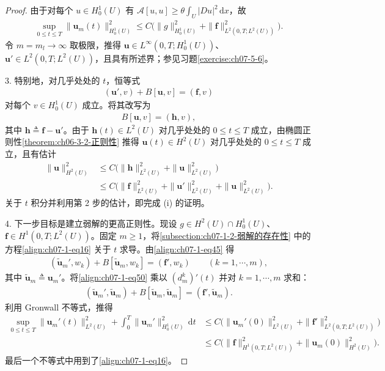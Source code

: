 \documentclass[../../main.tex]{subfiles}
\begin{document}
\begin{proof}
由于对每个 $u\in H^1_0(U)$ 有 $\mathcal{A}[u,u]\geqslant\theta\int_U|Du|^2\,\mathrm{d}x$，故
\begin{align}
\sup_{0\leqslant t\leqslant T}\|\mathbf{u}_m(t)\|_{H^1_0(U)}^2 \leqslant C\bigl(\|g\|_{H^1_0(U)}^2+\|\mathbf{f}\|_{L^2(0,T;L^2(U))}^2\bigr).\label{align:ch07-1-eq48}
\end{align}
令 $m=m_l\to\infty$ 取极限，推得 $\mathbf{u}\in L^\infty(0,T;H^1_0(U))$、$\mathbf{u}'\in L^2(0,T;L^2(U))$，且具有所述界；参见习题\cref{exercise:ch07-5-6}。

3. 特别地，对几乎处处的 $t$，恒等式
\begin{align*}
(\mathbf{u}',v)+B[\mathbf{u},v]=(\mathbf{f},v)
\end{align*}
对每个 $v\in H^1_0(U)$ 成立。将其改写为
\begin{align*}
B[\mathbf{u},v]=(\mathbf{h},v),
\end{align*}
其中 $\mathbf{h}\triangleq\mathbf{f}-\mathbf{u}'$。由于 $\mathbf{h}(t)\in L^2(U)$ 对几乎处处的 $0\leqslant t\leqslant T$ 成立，由椭圆正则性\cref{theorem:ch06-3-2-正则性} 推得 $\mathbf{u}(t)\in H^2(U)$ 对几乎处处的 $0\leqslant t\leqslant T$ 成立，且有估计
\begin{align}
\|\mathbf{u}\|_{H^2(U)}^2 &\leqslant C\bigl(\|\mathbf{h}\|_{L^2(U)}^2+\|\mathbf{u}\|_{L^2(U)}^2\bigr)\nonumber\\
&\leqslant C\bigl(\|\mathbf{f}\|_{L^2(U)}^2+\|\mathbf{u}'\|_{L^2(U)}^2+\|\mathbf{u}\|_{L^2(U)}^2\bigr).\label{align:ch07-1-eq49}
\end{align}
关于 $t$ 积分并利用第 2 步的估计，即完成 (i) 的证明。

4. 下一步目标是建立弱解的更高正则性。现设 $g\in H^2(U)\cap H^1_0(U)$、$\mathbf{f}\in H^1(0,T;L^2(U))$。固定 $m\geqslant 1$，将\cref{subsection:ch07-1-2-弱解的存在性} 中的方程\eqref{align:ch07-1-eq16} 关于 $t$ 求导。由\eqref{align:ch07-1-eq45} 得
\begin{align}
(\widetilde{\mathbf{u}}_m',w_k)+B[\widetilde{\mathbf{u}}_m,w_k]=(\mathbf{f}',w_k)\qquad (k=1,\cdots,m),\label{align:ch07-1-eq50}
\end{align}
其中 $\widetilde{\mathbf{u}}_m\triangleq\mathbf{u}_m'$。将\eqref{align:ch07-1-eq50} 乘以 $(d_m^k)'(t)$ 并对 $k=1,\cdots,m$ 求和：
\begin{align*}
(\widetilde{\mathbf{u}}_m',\widetilde{\mathbf{u}}_m)+B[\widetilde{\mathbf{u}}_m,\widetilde{\mathbf{u}}_m]=(\mathbf{f}',\widetilde{\mathbf{u}}_m).
\end{align*}
利用 Gronwall 不等式，推得
\begin{align}
\sup_{0\leqslant t\leqslant T}\|\mathbf{u}_m'(t)\|_{L^2(U)}^2 + \int_0^T \|\mathbf{u}_m'\|_{H^1_0(U)}^2\,\mathrm{d}t
&\leqslant C\bigl(\|\mathbf{u}_m'(0)\|_{L^2(U)}^2+\|\mathbf{f}'\|_{L^2(0,T;L^2(U))}^2\bigr)\nonumber\\
&\leqslant C\bigl(\|\mathbf{f}\|_{H^1(0,T;L^2(U))}^2+\|\mathbf{u}_m(0)\|_{H^2(U)}^2\bigr).\label{align:ch07-1-eq51}
\end{align}
最后一个不等式中用到了\eqref{align:ch07-1-eq16}。


\end{proof}
\end{document}
